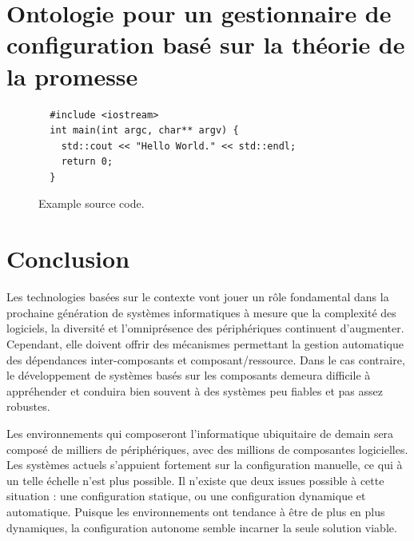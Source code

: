 \section{Ontologie pour un gestionnaire de configuration basé sur la théorie de
la promesse}


\begin{figure}
  \begin{verbatim}
  #include <iostream>
  int main(int argc, char** argv) {
    std::cout << "Hello World." << std::endl;
    return 0;
  }
  \end{verbatim}
  \caption{Example source code.}
  \label{fig:sourcecode}
\end{figure}

\section{Conclusion}

Les technologies basées sur le contexte vont jouer un rôle fondamental dans la
prochaine génération de systèmes informatiques à mesure que la complexité des
logiciels, la diversité et l'omniprésence des périphériques continuent
d'augmenter. Cependant, elle doivent offrir des mécanismes permettant la
gestion automatique des dépendances inter-composants et composant/ressource.
Dans le cas contraire, le développement de systèmes basés sur les composants
demeura difficile à appréhender et conduira bien souvent à des systèmes peu
fiables et pas assez robustes.

Les environnements qui composeront l'informatique ubiquitaire de demain sera
composé de milliers de périphériques, avec des millions de composantes
logicielles. Les systèmes actuels s'appuient fortement sur la configuration
manuelle, ce qui à un telle échelle n'est plus possible. Il n'existe que deux
issues possible à cette situation : une configuration statique, ou une
configuration dynamique et automatique. Puisque les environnements ont
tendance à être de plus en plus dynamiques, la configuration autonome semble
incarner la seule solution viable.

